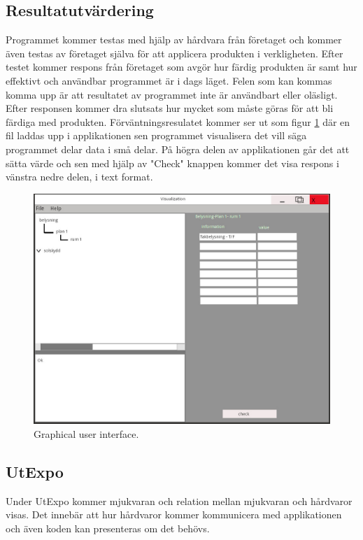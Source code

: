 \documentclass{article}
\begin{document}
\subsection{Resultatutvärdering}
Programmet kommer testas med hjälp av hårdvara från företaget 
och kommer även testas av företaget själva för att applicera produkten i verkligheten. Efter testet kommer respons från företaget som avgör hur färdig produkten är samt hur effektivt och användbar programmet är i dags läget. Felen som kan kommas komma upp är att resultatet av programmet inte är användbart eller oläsligt. Efter responsen kommer dra slutsats hur mycket som måste göras för att bli färdiga med produkten.
Förväntningsresulatet kommer ser ut som figur \ref{fig:GUI} där en fil laddas upp i applikationen sen programmet visualisera det vill säga programmet delar data i små delar. På högra delen av applikationen går det att sätta värde och sen med hjälp av "Check" knappen kommer det visa respons i vänstra nedre delen, i text format.\newline
\begin{figure}
    \includegraphics[width=\linewidth]{../SourceFiles/Visualization.jpg}
    \caption{Graphical user interface.}
    \label{fig:GUI}
\end{figure}
\subsection{UtExpo}
Under UtExpo kommer mjukvaran och relation mellan mjukvaran och hårdvaror visas. Det innebär att hur hårdvaror kommer kommunicera med applikationen och även koden kan presenteras om det behövs.\newline
\newpage
\end{document}
